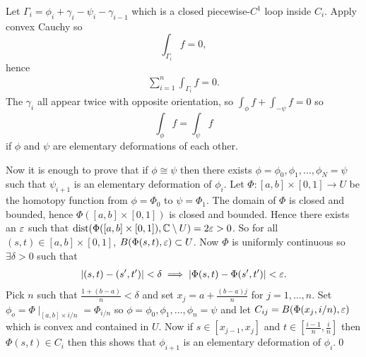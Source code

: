 \documentclass{article}
\begin{document}
\par
Let $ \Gamma_i = \phi_i + \gamma_i - \psi_i - \gamma_{i-1} $ which is a closed piecewise-$ C^1 $ loop inside $ C_i $. Apply convex Cauchy so
\[
	\int_{\Gamma_i} f = 0,
\]
hence
\begin{align*}
	\sum_{i=1}^n \int_{\Gamma_i} f = 0.
\end{align*}
The $ \gamma_i $ all appear twice with opposite orientation, so $ \int_\phi f + \int_{-\psi} f = 0 $ so
\[
  \int_\phi f = \int_\psi f
\]
if $ \phi $ and $ \psi $ are elementary deformations of each other.\par
Now it is enough to prove that if $ \phi\cong\psi $ then there exists $ \phi  = \phi_0,\phi_1,\dots, \phi_N = \psi $ such that $ \psi_{i+1} $ is an elementary deformation of $ \phi_i $. Let $ \Phi:[a,b]\times [0,1]\to U $ be the homotopy function from $ \phi = \Phi_0 $ to $ \psi = \Phi_1 $. The domain of $ \Phi $ is closed and bounded, hence $ \Phi([a,b]\times [0,1]) $ is closed and bounded. Hence there exists an $ \varepsilon $ such that $ \mathrm{dist}(\Phi([a,b]\times[0,1]),\mathbb{C}\setminus U) = 2\varepsilon>0 $. So for all $(s,t) \in [a,b]\times [0,1] $, $ B(\Phi(s,t),\varepsilon) \subset U $. Now $ \Phi $ is uniformly continuous so $ \exists\delta >0 $ such that 
\begin{align*}
  |(s,t)-(s',t')|<\delta \implies |\Phi(s,t)-\Phi(s',t')|<\varepsilon.
\end{align*}
Pick $ n $ such that $ \frac {1+(b-a)}n < \delta $ and set $ x_j = a+ \frac{(b-a)j}n $ for $ j=1,\dots, n $. Set $ \phi_o = \Phi\mid_{[a,b]\times i/n}  = \Phi_{i/n} $ so $ \phi = \phi_0, \phi_1,\dots, \phi_n =  \psi $ and let $ C_{ij}= B(\Phi(x_j,i/n),\varepsilon) $ which is convex and contained in $ U $. Now if $ s\in [x_{j-1}, x_j] $ and $ t\in \left[\frac {i-1}n , \frac in\right] $ then $ \Phi(s,t)\in C_i $ then this shows that $ \phi_{i+1} $ is an elementary deformation of $ \phi_i $.\qed
\end{document}
